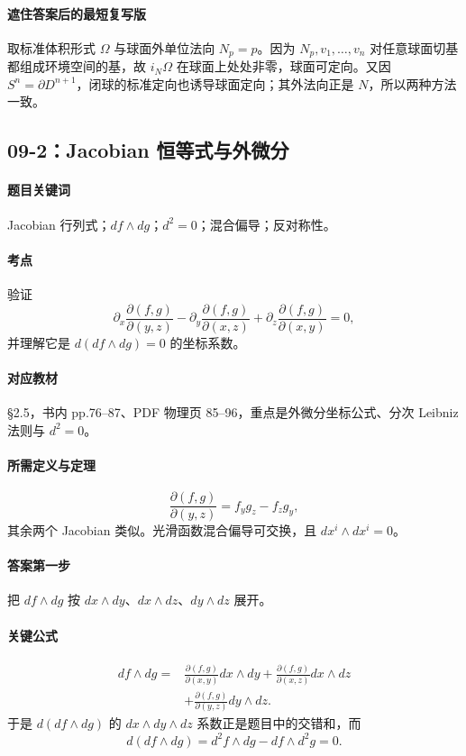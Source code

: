 \documentclass[12pt,a4paper]{ctexart}
\begin{document}
\paragraph{遮住答案后的最短复写版}
取标准体积形式 $\Omega$ 与球面外单位法向 $N_p=p$。因为 $N_p,v_1,\ldots,v_n$ 对任意球面切基都组成环境空间的基，故 $i_N\Omega$ 在球面上处处非零，球面可定向。又因 $S^n=\partial D^{n+1}$，闭球的标准定向也诱导球面定向；其外法向正是 $N$，所以两种方法一致。

\subsection{09-2：Jacobian 恒等式与外微分}

\paragraph{题目关键词}
Jacobian 行列式；$df\wedge dg$；$d^2=0$；混合偏导；反对称性。

\paragraph{考点}
验证
\[
  \partial_x\frac{\partial(f,g)}{\partial(y,z)}
  -
  \partial_y\frac{\partial(f,g)}{\partial(x,z)}
  +
  \partial_z\frac{\partial(f,g)}{\partial(x,y)}
  =0,
\]
并理解它是 $d(df\wedge dg)=0$ 的坐标系数。

\paragraph{对应教材}
\S 2.5，书内 pp.76--87、PDF 物理页 85--96，重点是外微分坐标公式、分次 Leibniz 法则与 $d^2=0$。

\paragraph{所需定义与定理}
\[
  \frac{\partial(f,g)}{\partial(y,z)}=f_yg_z-f_zg_y,
\]
其余两个 Jacobian 类似。光滑函数混合偏导可交换，且 $dx^i\wedge dx^i=0$。

\paragraph{答案第一步}
把 $df\wedge dg$ 按 $dx\wedge dy$、$dx\wedge dz$、$dy\wedge dz$ 展开。

\paragraph{关键公式}
\[
\begin{aligned}
  df\wedge dg
  ={}&
  \frac{\partial(f,g)}{\partial(x,y)}dx\wedge dy
  +
  \frac{\partial(f,g)}{\partial(x,z)}dx\wedge dz\\
  &+
  \frac{\partial(f,g)}{\partial(y,z)}dy\wedge dz.
\end{aligned}
\]
于是 $d(df\wedge dg)$ 的 $dx\wedge dy\wedge dz$ 系数正是题目中的交错和，而
\[
  d(df\wedge dg)=d^2f\wedge dg-df\wedge d^2g=0.
\]
\end{document}
